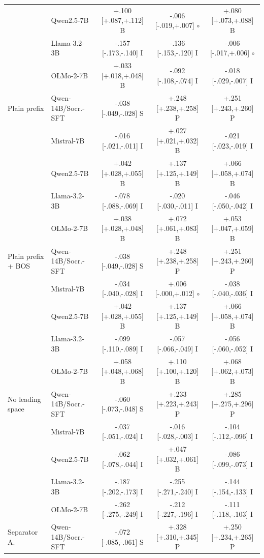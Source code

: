 \begin{table}[t]
\begin{tabular}{@{}llccc@{}}
 & Qwen2.5-7B & +.100 [+.087,+.112] B & -.006 [-.019,+.007] $\circ$ & +.080 [+.073,+.088] B \\
 & Llama-3.2-3B & -.157 [-.173,-.140] I & -.136 [-.153,-.120] I & -.006 [-.017,+.006] $\circ$ \\
 & OLMo-2-7B & +.033 [+.018,+.048] B & -.092 [-.108,-.074] I & -.018 [-.029,-.007] I \\
\addlinespace[1pt]
Plain prefix & Qwen-14B/Socr.-SFT & -.038 [-.049,-.028] S & +.248 [+.238,+.258] P & +.251 [+.243,+.260] P \\
 & Mistral-7B & -.016 [-.021,-.011] I & +.027 [+.021,+.032] B & -.021 [-.023,-.019] I \\
 & Qwen2.5-7B & +.042 [+.028,+.055] B & +.137 [+.125,+.149] B & +.066 [+.058,+.074] B \\
 & Llama-3.2-3B & -.078 [-.088,-.069] I & -.020 [-.030,-.011] I & -.046 [-.050,-.042] I \\
 & OLMo-2-7B & +.038 [+.028,+.048] B & +.072 [+.061,+.083] B & +.053 [+.047,+.059] B \\
\addlinespace[1pt]
Plain prefix + BOS & Qwen-14B/Socr.-SFT & -.038 [-.049,-.028] S & +.248 [+.238,+.258] P & +.251 [+.243,+.260] P \\
 & Mistral-7B & -.034 [-.040,-.028] I & +.006 [-.000,+.012] $\circ$ & -.038 [-.040,-.036] I \\
 & Qwen2.5-7B & +.042 [+.028,+.055] B & +.137 [+.125,+.149] B & +.066 [+.058,+.074] B \\
 & Llama-3.2-3B & -.099 [-.110,-.089] I & -.057 [-.066,-.049] I & -.056 [-.060,-.052] I \\
 & OLMo-2-7B & +.058 [+.048,+.068] B & +.110 [+.100,+.120] B & +.068 [+.062,+.073] B \\
\addlinespace[1pt]
No leading space & Qwen-14B/Socr.-SFT & -.060 [-.073,-.048] S & +.233 [+.223,+.243] P & +.285 [+.275,+.296] P \\
 & Mistral-7B & -.037 [-.051,-.024] I & -.016 [-.028,-.003] I & -.104 [-.112,-.096] I \\
 & Qwen2.5-7B & -.062 [-.078,-.044] I & +.047 [+.032,+.061] B & -.086 [-.099,-.073] I \\
 & Llama-3.2-3B & -.187 [-.202,-.173] I & -.255 [-.271,-.240] I & -.144 [-.154,-.133] I \\
 & OLMo-2-7B & -.262 [-.275,-.249] I & -.212 [-.227,-.196] I & -.111 [-.118,-.103] I \\
\addlinespace[1pt]
Separator A. & Qwen-14B/Socr.-SFT & -.072 [-.085,-.061] S & +.328 [+.310,+.345] P & +.250 [+.234,+.265] P \\

\end{tabular}
\end{table}
